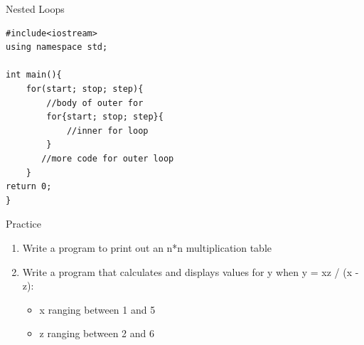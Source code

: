 \documentclass[xcolor={dvipsnames}]{beamer}
\begin{document}
\begin{frame}[fragile]{Nested Loops}
\begin{verbatim}
#include<iostream>
using namespace std;

int main(){
    for(start; stop; step){
        //body of outer for
        for{start; stop; step}{
            //inner for loop
        }
       //more code for outer loop
    }
return 0;
}
\end{verbatim}
\end{frame}

\begin{frame}{Practice}
	\begin{enumerate}
		\item Write a program to print out an n*n multiplication table
		\item Write a program that calculates and displays values for y when y = xz / (x - z):
			\begin{itemize}
				\item x ranging between 1 and 5 
				\item z ranging between 2 and 6
			\end{itemize}
	\end{enumerate}
\end{frame}
\end{document}
